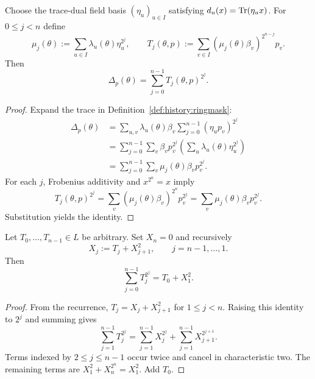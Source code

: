 \begin{lemma}\label{lem:history:frobdecomp}
Choose the trace-dual field basis $(\eta_u)_{u\in I}$ satisfying
$d_u(x)=\operatorname{Tr}(\eta_ux)$. For $0\leq j<n$ define
\[
 \mu_j(\theta):=\sum_{u\in I}\lambda_u(\theta)\eta_u^{2^j},
 \qquad
 T_j(\theta,p):=
 \sum_{v\in I}(\mu_j(\theta)\beta_v)^{2^{n-j}}p_v.
\]
Then
\[
 \Delta_p(\theta)=\sum_{j=0}^{n-1}T_j(\theta,p)^{2^j}.
\]
\end{lemma}
\begin{proof}
Expand the trace in Definition~\ref{def:history:ringmask}:
\begin{align*}
 \Delta_p(\theta)
 &=\sum_{u,v}\lambda_u(\theta)\beta_v
           \sum_{j=0}^{n-1}(\eta_up_v)^{2^j}\\
 &=\sum_{j=0}^{n-1}\sum_v\beta_v p_v^{2^j}
           \left(\sum_u\lambda_u(\theta)\eta_u^{2^j}\right)\\
 &=\sum_{j=0}^{n-1}\sum_v\mu_j(\theta)\beta_vp_v^{2^j}.
\end{align*}
For each $j$, Frobenius additivity and $x^{2^n}=x$ imply
\[
 T_j(\theta,p)^{2^j}
 =\sum_v(\mu_j(\theta)\beta_v)^{2^n}p_v^{2^j}
 =\sum_v\mu_j(\theta)\beta_vp_v^{2^j}.
\]
Substitution yields the identity.
\end{proof}

\begin{lemma}\label{lem:history:backward}
Let $T_0,\ldots,T_{n-1}\in L$ be arbitrary. Set $X_n=0$ and recursively
\[
 X_j:=T_j+X_{j+1}^2,\qquad j=n-1,\ldots,1.
\]
Then
\[
 \sum_{j=0}^{n-1}T_j^{2^j}=T_0+X_1^2.
\]
\end{lemma}
\begin{proof}
From the recurrence, $T_j=X_j+X_{j+1}^2$ for $1\leq j<n$. Raising this identity to $2^j$ and summing gives
\[
 \sum_{j=1}^{n-1}T_j^{2^j}
 =\sum_{j=1}^{n-1}X_j^{2^j}
  +\sum_{j=1}^{n-1}X_{j+1}^{2^{j+1}}.
\]
Terms indexed by $2\leq j\leq n-1$ occur twice and cancel in characteristic two. The remaining terms are $X_1^2+X_n^{2^n}=X_1^2$. Add $T_0$.
\end{proof}

